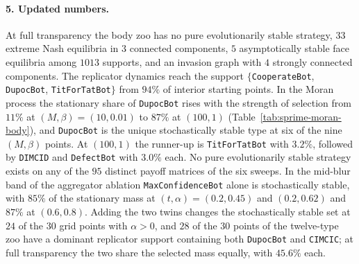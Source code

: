\paragraph{5. Updated numbers.}
At full transparency the body zoo has no pure evolutionarily stable strategy, $33$ extreme Nash equilibria in $3$ connected components, $5$ asymptotically stable face equilibria among $1013$ supports, and an invasion graph with $4$ strongly connected components. The replicator dynamics reach the support $\{$\texttt{CooperateBot}, \texttt{DupocBot}, \texttt{TitForTatBot}$\}$ from $94\%$ of interior starting points. In the Moran process the stationary share of \texttt{DupocBot} rises with the strength of selection from $11\%$ at $(M,\beta)=(10,0.01)$ to $87\%$ at $(100,1)$ (Table~\ref{tab:sprime-moran-body}), and \texttt{DupocBot} is the unique stochastically stable type at six of the nine $(M,\beta)$ points. At $(100,1)$ the runner-up is \texttt{TitForTatBot} with $3.2\%$, followed by \texttt{DIMCID} and \texttt{DefectBot} with $3.0\%$ each. No pure evolutionarily stable strategy exists on any of the $95$ distinct payoff matrices of the six sweeps.
In the mid-blur band of the aggregator ablation \texttt{MaxConfidenceBot} alone is stochastically stable, with $85\%$ of the stationary mass at $(t,\alpha)=(0.2,0.45)$ and $(0.2,0.62)$ and $87\%$ at $(0.6,0.8)$.
Adding the two twins changes the stochastically stable set at $24$ of the $30$ grid points with $\alpha>0$, and $28$ of the $30$ points of the twelve-type zoo have a dominant replicator support containing both \texttt{DupocBot} and \texttt{CIMCIC}; at full transparency the two share the selected mass equally, with $45.6\%$ each.
%
